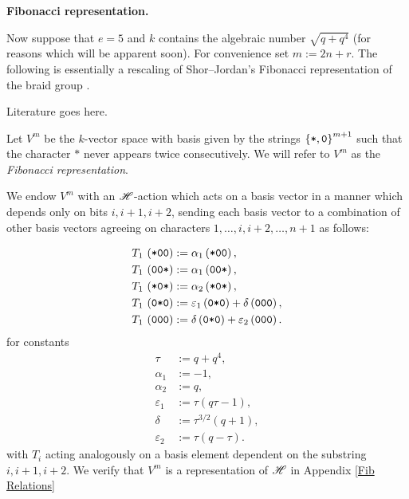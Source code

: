 \documentclass{amsart}
\newcommand{\fakesubsection}[1]{
    \vspace{7pt}
    \noindent \textbf{#1.}
  }
\begin{document}
  \def\vara{\alpha_1}
  \def\varb{\alpha_2}
  \def\varc{\varepsilon_1}
  \def\vard{\delta}
  \def\vare{\varepsilon_2}
  \def\vs{\texttt{*}}
  \def\vp{\texttt{0}}
  \fakesubsection{Fibonacci representation}
  Now suppose that $e = 5$ and $k$ contains the algebraic number $\sqrt{q + q^4}$ (for reasons which will be apparent soon).
  For convenience set $m := 2n + r$.
  The following is essentially a rescaling of Shor--Jordan's Fibonacci representation of the braid group \cite{Shor}.
 
  {\color{orange} Literature goes here.}

  \begin{definition}\label{Fib definition}
  Let $V^m$ be the $k$-vector space with basis given by the strings $\cbr{\vs,\vp}^{m+1}$ such that the character $\vs$ never appears twice consecutively. 
  We will refer to $V^m$ as the \emph{Fibonacci representation}.

  We endow $V^m$ with an $\mathscr{H}$-action which acts on a basis vector in a manner which depends only on bits $i,i+1,i+2$, sending each basis vector to a combination of other basis vectors agreeing on characters $1,\dots,i,i+2,\dots,n+1$ as follows:

  \begin{equation} 
    \begin{split}
      T_1 \, \prn{\vs\vp\vp} &:= \vara\prn{\vs\vp\vp},\\
      T_1 \, \prn{\vp\vp\vs} &:= \vara\prn{\vp\vp\vs},\\
      T_1 \, \prn{\vs\vp\vs} &:= \varb\prn{\vs\vp\vs},\\
      T_1 \, \prn{\vp\vs\vp} &:= \varc\prn{\vp\vs\vp} + \vard\prn{\vp\vp\vp},\\
      T_1 \, \prn{\vp\vp\vp} &:= \vard\prn{\vp\vs\vp} + \vare\prn{\vp\vp\vp}.
  \end{split} \label{Fib Action} 
  \end{equation}
  for constants
  \begin{equation}
    \begin{split}
    \tau  &:= q + q^4,\\
    \vara &:= -1,\\
    \varb &:= q,\\
    \varc &:= \tau(q\tau - 1),\\
    \vard &:= \tau^{3/2}(q + 1),\\
    \vare &:= \tau(q-\tau).
  \end{split} \label{Fib Constants} 
  \end{equation}
  with $T_i$ acting analogously on a basis element dependent on the substring $i,i+1,i+2$.
  We verify that $V^m$ is a representation of $\mathscr{H}$ in Appendix \ref{Fib Relations}
  \end{definition}
\end{document}
